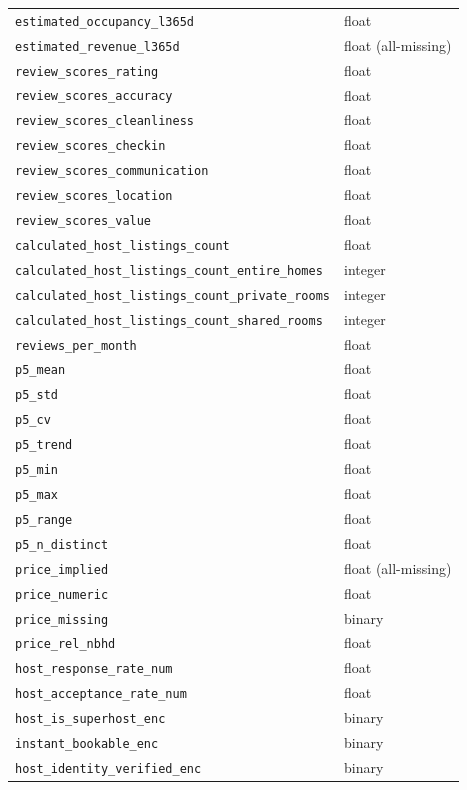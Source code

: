 \documentclass[journal]{IEEEtran}
\begin{document}
\begin{longtable}{p{2.2in}p{0.8in}}
\texttt{estimated\_occupancy\_l365d} & float \\
\texttt{estimated\_revenue\_l365d} & float (all-missing) \\
\texttt{review\_scores\_rating} & float \\
\texttt{review\_scores\_accuracy} & float \\
\texttt{review\_scores\_cleanliness} & float \\
\texttt{review\_scores\_checkin} & float \\
\texttt{review\_scores\_communication} & float \\
\texttt{review\_scores\_location} & float \\
\texttt{review\_scores\_value} & float \\
\texttt{calculated\_host\_listings\_count} & float \\
\texttt{calculated\_host\_listings\_count\_entire\_homes} & integer \\
\texttt{calculated\_host\_listings\_count\_private\_rooms} & integer \\
\texttt{calculated\_host\_listings\_count\_shared\_rooms} & integer \\
\texttt{reviews\_per\_month} & float \\
\texttt{p5\_mean} & float \\
\texttt{p5\_std} & float \\
\texttt{p5\_cv} & float \\
\texttt{p5\_trend} & float \\
\texttt{p5\_min} & float \\
\texttt{p5\_max} & float \\
\texttt{p5\_range} & float \\
\texttt{p5\_n\_distinct} & float \\
\texttt{price\_implied} & float (all-missing) \\
\texttt{price\_numeric} & float \\
\texttt{price\_missing} & binary \\
\texttt{price\_rel\_nbhd} & float \\
\texttt{host\_response\_rate\_num} & float \\
\texttt{host\_acceptance\_rate\_num} & float \\
\texttt{host\_is\_superhost\_enc} & binary \\
\texttt{instant\_bookable\_enc} & binary \\
\texttt{host\_identity\_verified\_enc} & binary \\

\end{longtable}
\end{document}

